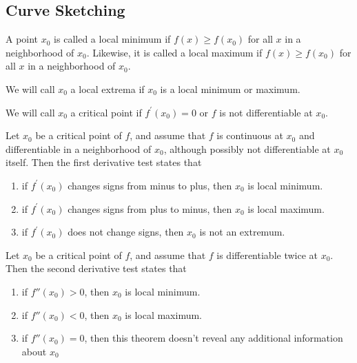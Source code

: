 \subsection{Curve Sketching}\label{subsec-curve-sketching}

\begin{definition}\label{def-local-minimum-maximum}
	A point $x_0$ is called a local minimum if $f(x) \geq f(x_0)$ for all $x$ in
	a neighborhood of $x_0$. Likewise, it is called a local maximum if $f(x) \geq f(x_0)$
	for all $x$ in a neighborhood of $x_0$.
\end{definition}

\begin{definition}\label{def-extrema}
	We will call $x_0$ a local extrema if $x_0$ is a local minimum or maximum.
\end{definition}

\begin{definition}\label{def-critical-point}
	We will call $x_0$ a critical point if $f^\prime(x_0)=0$ or $f$ is not differentiable
	at $x_0$.
\end{definition}

\begin{thm}\label{thm-first-derivative-test}
	Let $x_0$ be a critical point of $f$, and assume that $f$ is continuous at $x_0$
	and differentiable in a neighborhood of $x_0$, although possibly not differentiable
	at $x_0$ itself. Then the first derivative test states that
	\begin{enumerate}
		\item if $f^\prime(x_0)$ changes signs from minus to plus, then
		      $x_0$ is local minimum.
		\item if $f^\prime(x_0)$ changes signs from plus to minus, then
		      $x_0$ is local maximum.
		\item if $f^\prime(x_0)$ does not change signs, then $x_0$ is not an
		      extremum.
	\end{enumerate}
\end{thm}

\begin{thm}\label{thm-second-derivative-test}
	Let $x_0$ be a critical point of $f$, and assume that $f$ is differentiable twice
	at $x_0$. Then the second derivative test states that
	\begin{enumerate}
		\item if $f''(x_0)>0$, then $x_0$ is local minimum.
		\item if $f''(x_0)<0$, then $x_0$ is local maximum.
		\item if $f''(x_0)=0$, then this theorem doesn't reveal any additional
		      information about $x_0$
	\end{enumerate}
\end{thm}

